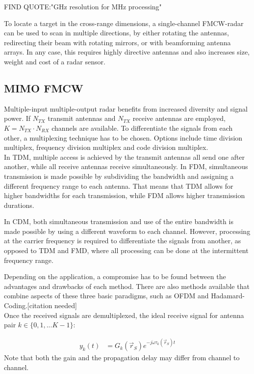 FIND QUOTE:"GHz resolution for MHz processing"

To locate a target in the cross-range dimensions,
a single-channel FMCW-radar can be used to scan in multiple directions,
by either rotating the antennas, redirecting their beam with rotating mirrors, or with beamforming antenna arrays.
In any case, this requires highly directive antennas and also increases size, weight and cost of a radar sensor.

\subsection{MIMO FMCW}
Multiple-input multiple-output radar benefits from increased diversity and signal power.
If $N_{TX}$ transmit antennas and $N_{TX}$ receive antennas are employed, $K=N_{TX} \cdot N_{RX}$ channels are available.
To differentiate the signals from each other, a multiplexing technique has to be chosen.
Options include time division multiplex, frequency division multiplex and code division multiplex. \\

In TDM, multiple access is achieved by the transmit antennas all send one after another,
while all receive antennas receive simultaneously.
In FDM, simultaneous transmission is made possible by subdividing the bandwidth and assigning a different frequency range to each antenna.
That means that TDM allows for higher bandwidths for each transmission, while FDM allows higher transmission durations.

In CDM, both simultaneous transmission and use of the entire bandwidth is made possible by using a different waveform to each channel.
However, processing at the carrier frequency is required to differentiate the signals from another, as opposed to TDM and FMD,
where all processing can be done at the intermittent frequency range.

Depending on the application, a compromise has to be found between the advantages and drawbacks of each method.
There are also methods available that combine aspects of these three basic paradigms, such as OFDM and Hadamard-Coding.[citation needed] \\

Once the received signals are demultiplexed, the ideal receive signal for antenna pair $k \in \{0,1,...K-1\}$:

\begin{align}
    y_k(t) & = G_k(\vec r_S)e^{-j\dot\omega\tau_k(\vec r_S)t} \label{eqn:ideal_scatterer}
\end{align}
Note that both the gain and the propagation delay may differ from channel to channel.

